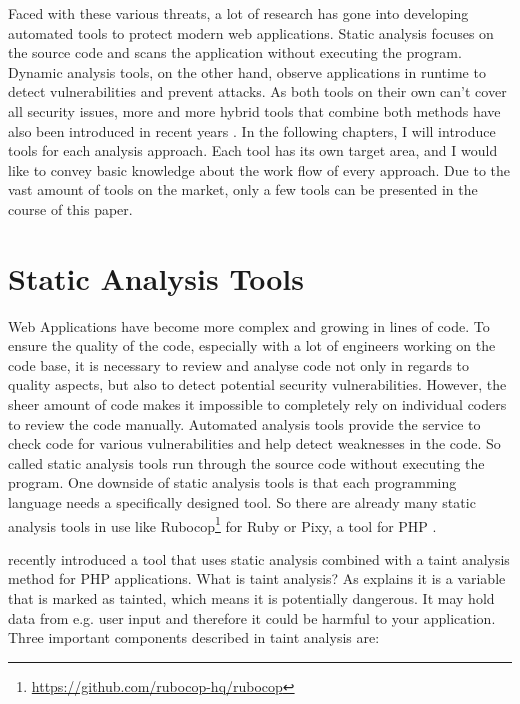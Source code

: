 Faced with these various threats, a lot of research has gone into developing automated tools to protect modern web applications. Static analysis focuses on the source code and scans the application without executing the program. Dynamic analysis tools, on the other hand, observe applications in runtime to detect vulnerabilities and prevent attacks. As both tools on their own can't cover all security issues, more and more hybrid tools that combine both methods have also been introduced in recent years \autocite[]{Jahanshahi2018, Lam2008, Hosek2011}.\newline 
In the following chapters, I will introduce tools for each analysis approach. Each tool has its own target area, and I would like to convey basic knowledge about the work flow of every approach. Due to the vast amount of tools on the market, only a few tools can be presented in the course of this paper.


\section{Static Analysis Tools}
Web Applications have become more complex and growing in lines of code. To ensure the quality of the code, especially with a lot of engineers working on the code base, it is necessary to review and analyse code not only in regards to quality aspects, but also to detect potential security vulnerabilities. However, the sheer amount of code makes it impossible to completely rely on individual coders to review the code manually. Automated analysis tools provide the service to check code for various vulnerabilities and help detect weaknesses in the code. So called static analysis tools run through the source code without executing the program. One downside of static analysis tools is that each programming language needs a specifically designed tool. So there are already many static analysis tools in use like Rubocop\footnote{ \url{https://github.com/rubocop-hq/rubocop}} for Ruby or Pixy, a tool for PHP \autocite[]{Jovanovic2006}. \newline 



\textcite[]{Maskur2019} recently introduced a tool that uses static analysis combined with a taint analysis method for PHP applications. What is taint analysis? As \textcite[]{Shannon2018} explains it is a variable that is marked as tainted, which means it is potentially dangerous. It may hold data from e.g. user input and therefore it could be harmful to your application. Three important components described in taint analysis are:

